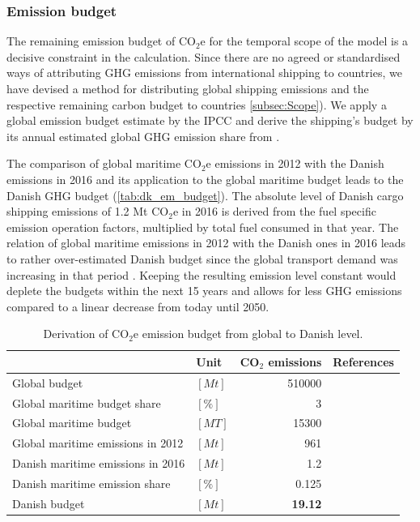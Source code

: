 \documentclass[article]{elsarticle}
\begin{document}
\subsubsection{Emission budget}
\label{subsec:em_budget}
The remaining emission budget of CO$_2$e for the temporal scope of the model is a decisive constraint in the calculation. Since there are no agreed or standardised ways of attributing GHG emissions from international shipping to countries, we have devised a method for distributing global shipping emissions and the respective remaining carbon budget to countries \ref{subsec:Scope}). We apply a global emission budget estimate by the IPCC \cite[Tab.~SPM.3, RCP2.6]{IPCC2013} and derive the shipping's budget by its annual estimated global GHG emission share from \citet{Olmer2017}.

The comparison of global maritime CO$_2$e emissions in 2012 with the Danish emissions in 2016 and its application to the global maritime budget leads to the Danish GHG budget (\autoref{tab:dk_em_budget}). The absolute level of Danish cargo shipping emissions of 1.2 Mt CO$_2$e in 2016 is derived from the fuel specific emission operation factors, multiplied by total fuel consumed in that year. The relation of global maritime emissions in 2012 with the Danish ones in 2016 leads to rather over-estimated Danish budget since the global transport demand was increasing in that period \cite[Tab.~3,~p.~5]{UNCTAD2017}. Keeping the resulting emission level constant would deplete the budgets within the next 15 years and allows for less GHG emissions compared to a linear decrease from today until 2050.
\begin{table}[htb]
    \centering
    \begin{tabular}{llrr}
        \toprule
         & Unit & CO$_2$ emissions & References \\
         \midrule
         Global budget & $\left[Mt\right]$ & 510000 & \cite{IPCC2013} \\
         Global maritime budget share & $\left[\%\right]$ & 3 & \cite{Olmer2017} \\
         Global maritime budget & $\left[MT\right]$ & 15300 &\\[1.5ex]
         Global maritime emissions in 2012 & $\left[Mt\right]$ & 961 & \cite{Smith2014} \\
         Danish maritime emissions in 2016 & $\left[Mt\right]$ & 1.2 & \cite{Kristensen2012,Eurostat2018,Wisdom2017} \\
         Danish maritime emission share & $\left[\%\right]$ & 0.125 &\\[1.5ex]
         Danish budget & $\left[Mt\right]$ & \textbf{19.12} & \\
         \bottomrule
    \end{tabular}
    \caption{Derivation of CO$_2$e emission budget from global to Danish level.}
    \label{tab:dk_em_budget}
\end{table}
\end{document}
